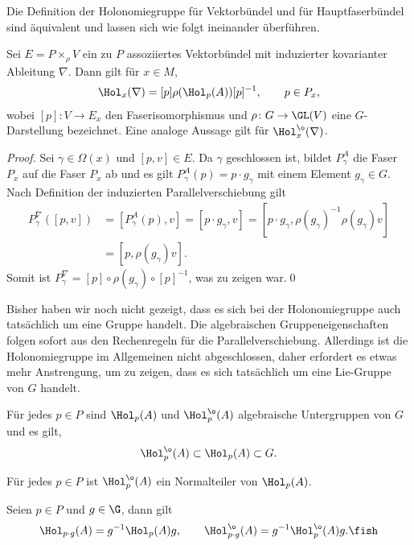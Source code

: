 \documentclass[%
	paper=a5,%
	fleqn,%
	DIV=18,%
	BCOR=0mm,
	fontsize=11pt,
	titlepage=false,%
	bibliography=totoc,
	DIV=18,%
	twoside=true,
	pdftitle=Riemannsche Geometrie,
	pdfauthor=Uwe Semmelmann,
	numbers=noendperiod]%
	{scrbook}
\begin{document}
Die Definition der Holonomiegruppe für Vektorbündel und für Hauptfaserbündel sind äquivalent und lassen sich wie folgt ineinander überführen.

\begin{prop}
Sei $E= P\times_\rho V$ ein zu $P$ assoziiertes Vektorbündel mit induzierter kovarianter Ableitung $\nabla$. Dann gilt für $x\in M$,
\begin{align*}
\Hol_x(\nabla) = [p] \rho(\Hol_p(A))[p]^{-1},\qquad p\in P_x,
\end{align*}
wobei $[p]\colon V\to E_x$ den Faserisomorphismus und $\rho\colon G\to \GL(V)$ eine
$G$-Darstellung bezeichnet. Eine analoge Aussage gilt f\"ur $\Hol_{x}^{\o}(\nabla)$.\fish
\end{prop}
\begin{proof}
Sei $\gamma\in \Omega(x)$ und $[p,v]\in E$. Da $\gamma$ geschlossen ist, bildet
$P_\gamma^A$ die Faser $P_x$ auf die Faser $P_x$ ab und es gilt $P_\gamma^A(p)
= p\cdot g_\gamma$ mit einem Element $g_\gamma\in G$. Nach Definition der
induzierten Parallelverschiebung gilt
\begin{align*}
P_\gamma^\nabla([p,v]) &= [P_\gamma^A(p),v]
= [p\cdot g_\gamma, v]
= [p\cdot g_\gamma, \rho(g_\gamma)^{-1} \rho(g_\gamma)v]\\
&= [p, \rho(g_\gamma)v].
\end{align*}
Somit ist $P_{\gamma}^{\nabla}  = [p] \circ \rho(g_{\gamma}) \circ [p]^{-1}$, was zu zeigen war.\qed
\end{proof}

Bisher haben wir noch nicht gezeigt, dass es sich bei der Holonomiegruppe auch tats\"achlich um eine Gruppe handelt. Die algebraischen Gruppeneigenschaften folgen sofort aus den Rechenregeln f\"ur die Parallelverschiebung. Allerdings ist die Holonomiegruppe im Allgemeinen nicht abgeschlossen, daher erfordert es etwas mehr Anstrengung, um zu zeigen, dass es sich tats\"achlich um eine Lie-Gruppe von $G$ handelt.

\begin{lem}
\begin{propenum}
\item F\"ur jedes $p\in P$ sind $\Hol_{p}(A)$ und $\Hol_{p}^{\o}(A)$ algebraische Untergruppen von $G$ und es gilt,
\begin{align*}
\Hol_{p}^{\o}(A)\subset \Hol_{p}(A) \subset G.
\end{align*}
\item Für jedes $p\in P$ ist $\Hol_{p}^\o(A)$ ein Normalteiler von $\Hol_{p}(A)$.
\item Seien $p\in P$ und $g\in \G$, dann gilt
\begin{align*}
\Hol_{p\cdot g}(A) = g^{-1}\Hol_{p}(A)g,\qquad
\Hol_{p\cdot g}^\o(A) = g^{-1}\Hol_{p}^\o(A)g.\fish
\end{align*}
\end{propenum}
\end{lem}
\end{document}
